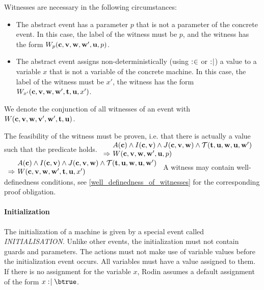Witnesses are necessary in the following circumstances:
\begin{itemize}
\item The abstract event has a parameter $p$ that is not a parameter of the concrete  event.
  In this case, the label of the witness must be $p$, and the witness has the form 
  $W_p(\mathbf{c},{\mathbf{v},\mathbf{w}},\mathbf{w}',\mathbf{u},p)$.
\item The abstract event assigns non-deterministically (using $\mathrel{:\mkern1mu\in}$ or $\mathrel{:\mkern1mu\mid}$) 
  a value to a variable $x$ that is not a variable of the concrete machine.
  In this case, the label of the witness must be $x'$, the witness has the form
  $W_{x'}(\mathbf{c},{\mathbf{v},\mathbf{w}},\mathbf{w}',{\mathbf{t},\mathbf{u}},x')$.
\end{itemize}
We denote the conjunction of all witnesses of an event with $W(\mathbf{c},{\mathbf{v},\mathbf{w}},\mathbf{v}',\mathbf{w}',{\mathbf{t},\mathbf{u}})$.

The feasibility of the witness must be proven, i.e. that there is actually a value such that the
 predicate holds.
%
  {$\begin{array}{r@{\ }l}
      & \axioms \land \absinvariants \land \concinvariants \land \bapred \\
      \limp & W(\allconstants,\allvariables,\concvariables',\concparameters,p)      
    \end{array}$}
%
  {$\begin{array}{r@{\ }l}
      & \axioms \land \absinvariants \land \concinvariants \land \bapred \\
      \limp & W(\allconstants,\allvariables,\concvariables',\allparameters,x')
    \end{array}$}
A witness may contain well-definedness conditions, see \ref{well_definedness_of_witnesses}
  for the corresponding proof obligation.

\paragraph{Initialization}
\label{initialization}
The initialization of a machine is given by a special event called \textsl{INITIALISATION}.
Unlike other events, the initialization must not contain guards and parameters.
The actions must not make use of variable values before the initialization event occurs.
All variables must have a value assigned to them. If there is no assignment for the variable $x$, Rodin assumes a default assignment of the form $x\bcmsuch \btrue$.

